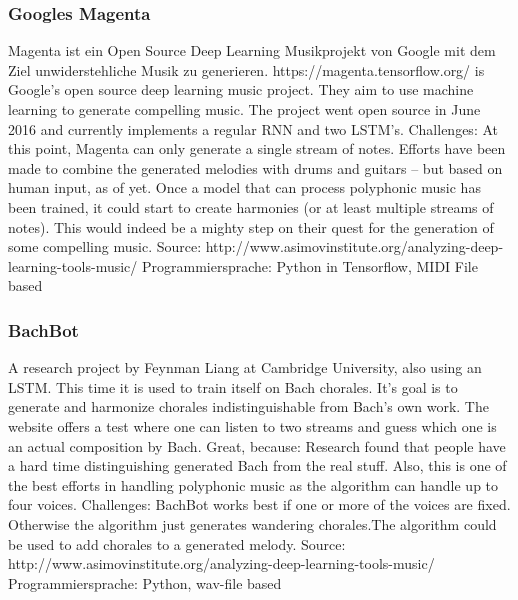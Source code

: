 {\subsubsection{Googles Magenta}
Magenta ist ein Open Source Deep Learning Musikprojekt von Google mit dem Ziel unwiderstehliche Musik zu generieren.
https://magenta.tensorflow.org/
 is Google’s open source deep learning music project. They aim to use machine learning to generate compelling music. The project went open source in June 2016 and currently implements a regular RNN and two LSTM’s.
Challenges: At this point, Magenta can only generate a single stream of notes. Efforts have been made to combine the generated melodies with drums and guitars – but based on human input, as of yet. Once a model that can process polyphonic music has been trained, it could start to create harmonies (or at least multiple streams of notes). This would indeed be a mighty step on their quest for the generation of some compelling music.
Source: http://www.asimovinstitute.org/analyzing-deep-learning-tools-music/
Programmiersprache: Python in Tensorflow, MIDI File based

\subsubsection{BachBot}
A research project by Feynman Liang at Cambridge University,  also using an LSTM. This time it is used to train itself on Bach chorales. It’s goal is to generate and harmonize chorales indistinguishable from Bach’s own work. The website offers a test where one can listen to two streams and guess which one is an actual composition by Bach.
Great, because: Research found that people have a hard time distinguishing generated Bach from the real stuff. Also, this is one of the best efforts in handling polyphonic music as the algorithm can handle up to four voices.
Challenges: BachBot works best if one or more of the voices are fixed. Otherwise the algorithm just generates wandering chorales.The algorithm could be used to add chorales to a generated melody.
Source: http://www.asimovinstitute.org/analyzing-deep-learning-tools-music/
Programmiersprache: Python, wav-file based

}
